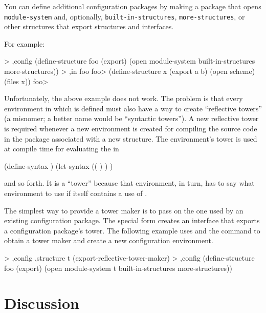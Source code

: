 You can define additional configuration packages by making a package
 that opens {\tt module-\ok{}system} and, optionally,
 {\tt built-in-\ok{}structures},
 {\tt more-\ok{}structures}, or other structures that
 export structures and interfaces.

For example:
\begin{example}
> ,config (define-structure foo (export)
            (open module-system
                  built-in-structures
                  more-structures))
> ,in foo
foo> (define-structure x (export a b)
       (open scheme)
       (files x))
foo> 
\end{example}

Unfortunately, the above example does not work.
The problem is that every environment in which
  is defined must also have a way to
 create ``reflective towers'' (a misnomer; a better name would be
 ``syntactic towers'').
A new reflective tower is required whenever a new environment is created for
 compiling the source code in the package associated with a new structure.
The environment's tower is used at compile time for
 evaluating the  in
\begin{example}
(define-syntax  )
(let-syntax (( ) ) )
\end{example}
 and so forth.
It is a ``tower'' because that environment, in turn, has to say what environment
 to use if  itself contains a use of .

The simplest way to provide a tower maker is to pass on the one used by
 an existing configuration package.
The special form  creates an interface
 that exports a configuration package's tower.
The following example uses  and
 the  command to obtain a tower maker and create a new
 configuration environment.

\begin{example}
> ,config ,structure t (export-reflective-tower-maker)
> ,config (define-structure foo (export)
            (open module-system
                  t
                  built-in-structures
                  more-structures))
\end{example}


\section{Discussion}

